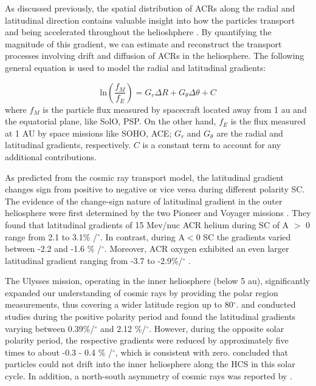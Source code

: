 As discussed previously, the spatial distribution of \acp{ACR} along the radial and latitudinal direction contains valuable insight into how the particles transport and being accelerated throughout the helioshphere \citep{Rankin2021ApJ}. By quantifying the magnitude of this gradient, we can estimate and reconstruct the transport processes involving drift and diffusion of \acp{ACR} in the heliosphere. The following general equation is used to model the radial and latitudinal gradients:

\begin{equation}
	\mathrm{ln}(\frac{f_{M}}{f_{E}}) = G_r \Delta R  + G_{\theta} \Delta \theta + C
\end{equation}
where $f_{M}$ is the particle flux measured by spacecraft located away from 1 au and the equatorial plane, like \ac{SolO}, \ac{PSP}. On the other hand, $f_{E}$ is the flux measured at 1 AU by space missions like \ac{SOHO}, \ac{ACE}; $G_r$ and $G_{\theta}$ are the radial and latitudinal gradients, respectively. $C$ is a constant term to account for any additional contributions.


As predicted from the cosmic ray transport model, the latitudinal gradient changes sign from positive to negative or vice versa during different polarity \ac{SC}. The evidence of the change-sign nature of latitudinal gradient in the outer heliosphere were first determined by the two Pioneer and Voyager missions \citep{Mckibben1979ApJ, Cummings1987GeoRL, Christon1986JGR}. They found that latitudinal gradients of 15 Mev/nuc \ac{ACR} helium during \ac{SC} of A $>$ 0 range from 2.1 to 3.1\% /$^\circ$. In contrast, during A$<$0 \ac{SC} the gradients varied between -2.2 and -1.6 \% /$^\circ$. Moreover, \ac{ACR} oxygen exhibited an even larger latitudinal gradient ranging from -3.7 to -2.9\%/$^\circ$ \citep{Cummings1987GeoRL}.

The Ulysses mission, operating in the inner heliosphere (below 5 au), significantly expanded our understanding of cosmic rays by providing the polar region measurements, thus covering a wider latitude region up to 80$^\circ$. \citet{Lanzerotti1995GeoRL} and \citet{Heber1998JGR} conducted studies during the positive polarity period and found the latitudinal gradients varying between 0.39\%/$^\circ$ and 2.12 \%/$^\circ$. However, during the opposite solar polarity period, the respective gradients were reduced by approximately five times to about -0.3 - 0.4 \% /$^\circ$, which is consistent with zero. \citet{Cummings2009GeoRL} concluded that particles could not drift into the inner heliosphere along the \ac{HCS} in this solar cycle. In addition, a north-south asymmetry of cosmic rays was reported by \citep{Simpson1996ApJ}.

